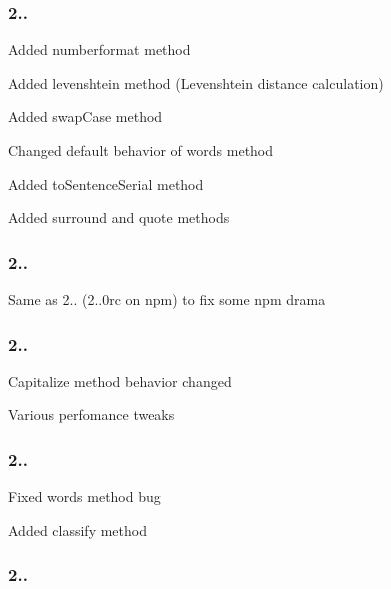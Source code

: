 \subsubsection*{2..}


\begin{DoxyItemize}
\item Added {\ttfamily numberformat} method
\item Added {\ttfamily levenshtein} method (Levenshtein distance calculation)
\item Added {\ttfamily swap\+Case} method
\item Changed default behavior of {\ttfamily words} method
\item Added {\ttfamily to\+Sentence\+Serial} method
\item Added {\ttfamily surround} and {\ttfamily quote} methods
\end{DoxyItemize}

\subsubsection*{2..}


\begin{DoxyItemize}
\item Same as 2.. (2..\+0rc on npm) to fix some npm drama
\end{DoxyItemize}

\subsubsection*{2..}


\begin{DoxyItemize}
\item Capitalize method behavior changed
\item Various perfomance tweaks
\end{DoxyItemize}

\subsubsection*{2..}


\begin{DoxyItemize}
\item Fixed words method bug
\item Added classify method
\end{DoxyItemize}

\subsubsection*{2..}


